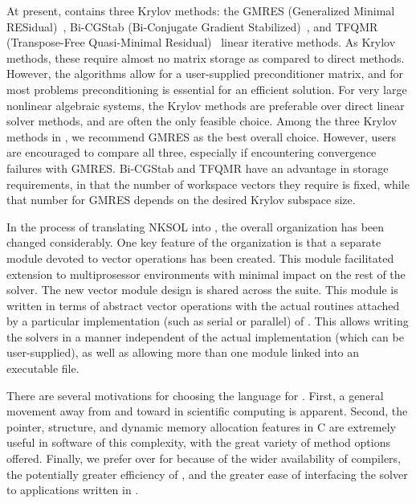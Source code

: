 At present, {\kinsol} contains three Krylov methods: the GMRES
(Generalized Minimal RESidual)~\cite{SaSc:86}, Bi-CGStab
(Bi-Conjugate Gradient Stabilized)~\cite{Van:92}, and TFQMR
(Transpose-Free Quasi-Minimal Residual)~\cite{Fre:93} linear
iterative methods. As Krylov methods, these require almost no
matrix storage as compared to direct methods. However, the
algorithms allow for a user-supplied preconditioner matrix,
and for most problems preconditioning is essential for an
efficient solution. For very large nonlinear algebraic systems,
the Krylov methods are preferable over direct linear solver methods,
and are often the only feasible choice. Among the three Krylov
methods in {\kinsol}, we recommend GMRES as the best overall
choice. However, users are encouraged to compare all three,
especially if encountering convergence failures with GMRES.
Bi-CGStab and TFQMR have an advantage in storage requirements,
in that the number of workspace vectors they require is fixed,
while that number for GMRES depends on the desired Krylov
subspace size.

In the process of translating NKSOL into {\C}, the overall
{\kinsol} organization has been changed considerably. One key
feature of the {\kinsol} organization is that a separate module
devoted to vector operations has been created.  This module
facilitated extension to multiprosessor environments with minimal
impact on the rest of the solver. The new vector module design is
shared across the {\sundials} suite. This {\nvector} module is
written in terms of abstract vector operations with the actual
routines attached by a particular implementation (such as serial
or parallel) of {\nvector}. This allows writing the {\sundials}
solvers in a manner independent of the actual {\nvector}
implementation (which can be user-supplied), as well as allowing
more than one {\nvector} module linked into an executable file.

 There are
several motivations for choosing the {\C} language for {\kinsol}.
First, a general movement away from {\F} and toward {\C} in
scientific computing is apparent. Second, the pointer, structure,
and dynamic memory allocation features in C are extremely useful
in software of this complexity, with the great variety of method
options offered. Finally, we prefer {\C} over {\CPP} for {\kinsol}
because of the wider availability of {\C} compilers, the
potentially greater efficiency of {\C}, and the greater ease of
interfacing the solver to applications written in {\F}.

